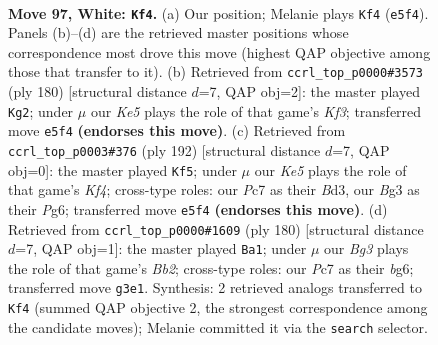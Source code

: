 \documentclass[11pt]{article}
\begin{document}
\clearpage

\begin{figure}[p]\centering
\begin{subfigure}{0.46\textwidth}\centering
\resizebox{\linewidth}{!}{%
\newchessgame
\chessboard[
  setfen={7k/2P5/8/4K3/8/6B1/8/8 w - - 19 97},
  showmover=false,
  pgfstyle=straightmove, color=movearrow, markmove={e5-f4}
]}
\caption{}
\end{subfigure}\hfill
\begin{subfigure}{0.46\textwidth}\centering
\resizebox{\linewidth}{!}{%
\newchessgame
\chessboard[
  setfen={8/8/8/k7/8/5Kp1/8/7B w - - 10 91},
  showmover=false,
  pgfstyle=straightmove, color=movearrow, markmove={f3-g2}
]}
\caption{}
\end{subfigure}
\\[4pt]
\begin{subfigure}{0.46\textwidth}\centering
\resizebox{\linewidth}{!}{%
\newchessgame
\chessboard[
  setfen={6k1/8/6P1/8/5K2/3B4/8/8 w - - 3 97},
  showmover=false,
  pgfstyle=straightmove, color=movearrow, markmove={f4-f5}
]}
\caption{}
\end{subfigure}\hfill
\begin{subfigure}{0.46\textwidth}\centering
\resizebox{\linewidth}{!}{%
\newchessgame
\chessboard[
  setfen={8/8/2k3b1/8/8/8/1B6/2K5 w - - 2 91},
  showmover=false,
  pgfstyle=straightmove, color=movearrow, markmove={b2-a1}
]}
\caption{}
\end{subfigure}
\caption{\textbf{Move 97, White: \texttt{Kf4}.} (a) Our position; Melanie plays \texttt{Kf4} (\texttt{e5f4}). Panels (b)--(d) are the retrieved master positions whose correspondence most drove this move (highest QAP objective among those that transfer to it). (b) Retrieved from \texttt{ccrl\_top\_p0000\#3573} (ply 180) [structural distance $d$=7, QAP obj=2]: the master played \texttt{Kg2}; under $\mu$ our \emph{Ke5} plays the role of that game's \emph{Kf3}; transferred move \texttt{e5f4} \textbf{(endorses this move)}. (c) Retrieved from \texttt{ccrl\_top\_p0003\#376} (ply 192) [structural distance $d$=7, QAP obj=0]: the master played \texttt{Kf5}; under $\mu$ our \emph{Ke5} plays the role of that game's \emph{Kf4}; cross-type roles: our \emph{P}c7 as their \emph{B}d3, our \emph{B}g3 as their \emph{P}g6; transferred move \texttt{e5f4} \textbf{(endorses this move)}. (d) Retrieved from \texttt{ccrl\_top\_p0000\#1609} (ply 180) [structural distance $d$=7, QAP obj=1]: the master played \texttt{Ba1}; under $\mu$ our \emph{Bg3} plays the role of that game's \emph{Bb2}; cross-type roles: our \emph{P}c7 as their \emph{b}g6; transferred move \texttt{g3e1}. Synthesis: 2 retrieved analogs transferred to \texttt{Kf4} (summed QAP objective 2, the strongest correspondence among the candidate moves); Melanie committed it via the \texttt{search} selector.}
\label{fig:thought-m192}
\end{figure}
\end{document}
